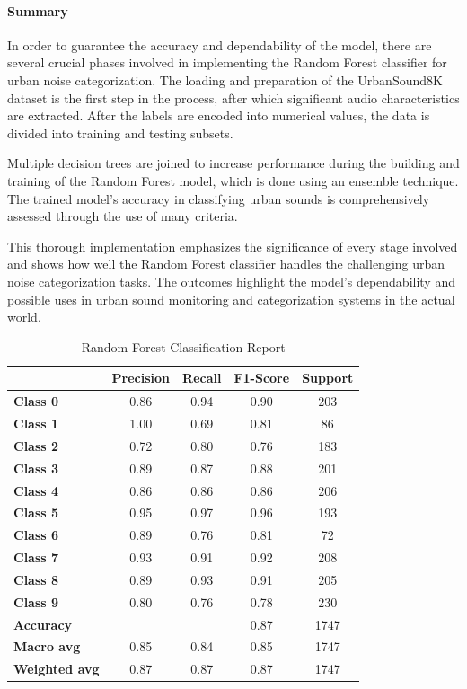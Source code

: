 \documentclass[conference]{IEEEtran}
\begin{document}
\paragraph{Summary}

In order to guarantee the accuracy and dependability of the model, there are several crucial phases involved in implementing the Random Forest classifier for urban noise categorization. The loading and preparation of the UrbanSound8K dataset is the first step in the process, after which significant audio characteristics are extracted. After the labels are encoded into numerical values, the data is divided into training and testing subsets.

Multiple decision trees are joined to increase performance during the building and training of the Random Forest model, which is done using an ensemble technique. The trained model's accuracy in classifying urban sounds is comprehensively assessed through the use of many criteria.

This thorough implementation emphasizes the significance of every stage involved and shows how well the Random Forest classifier handles the challenging urban noise categorization tasks. The outcomes highlight the model's dependability and possible uses in urban sound monitoring and categorization systems in the actual world.



\begin{table}[htbp]
\centering
\begin{tabular}{lcccc}
\toprule
 & \textbf{Precision} & \textbf{Recall} & \textbf{F1-Score} & \textbf{Support} \\
\midrule
\textbf{Class 0} & 0.86 & 0.94 & 0.90 & 203 \\
\textbf{Class 1} & 1.00 & 0.69 & 0.81 & 86 \\
\textbf{Class 2} & 0.72 & 0.80 & 0.76 & 183 \\
\textbf{Class 3} & 0.89 & 0.87 & 0.88 & 201 \\
\textbf{Class 4} & 0.86 & 0.86 & 0.86 & 206 \\
\textbf{Class 5} & 0.95 & 0.97 & 0.96 & 193 \\
\textbf{Class 6} & 0.89 & 0.76 & 0.81 & 72 \\
\textbf{Class 7} & 0.93 & 0.91 & 0.92 & 208 \\
\textbf{Class 8} & 0.89 & 0.93 & 0.91 & 205 \\
\textbf{Class 9} & 0.80 & 0.76 & 0.78 & 230 \\
\midrule
\textbf{Accuracy} &  &  & 0.87 & 1747 \\
\textbf{Macro avg} & 0.85 & 0.84 & 0.85 & 1747 \\
\textbf{Weighted avg} & 0.87 & 0.87 & 0.87 & 1747 \\
\bottomrule
\end{tabular}
\caption{Random Forest Classification Report}
\label{tab:classification_report}
\end{table}
\end{document}
